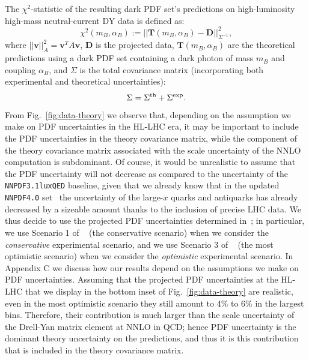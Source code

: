 \documentclass[withindex,glossary]{cam-thesis}
\renewcommand{\vec}[1]{\textbf{#1}} %
\begin{document}
The $\chi^2$-statistic of the resulting dark PDF set's predictions on high-luminosity high-mass neutral-current DY data is defined as: 
\begin{equation}
\label{eq:chi2stat}
\chi^2(m_B, \alpha_B) := ||\vec{T}(m_B, \alpha_B) - \vec{D}||^2_{\Sigma^{-1}},
\end{equation}
where $||\vec{v}||_{A}^2 = \vec{v}^T A \vec{v}$, $\vec{D}$ is the projected data, 
$\vec{T}(m_B,\alpha_B)$ are the theoretical predictions using a dark
PDF set containing a dark photon of mass $m_B$ and coupling
$\alpha_B$, and $\Sigma$ is the total
covariance matrix (incorporating both experimental and theoretical
uncertainties):
\begin{equation}
\Sigma = \Sigma^{\rm th}+\Sigma^{\rm exp}.
\end{equation}
From Fig.~\ref{fig:data-theory} we observe that, depending on the assumption we make on PDF
uncertainties in the HL-LHC era, it may be important to
include the PDF uncertainties in the theory covariance matrix, while
the component of the theory covariance matrix associated with the
scale uncertainty of the NNLO computation is subdominant. 
Of course, it would be unrealistic to assume that the PDF uncertainty will not decrease as compared to the
  uncertainty of the {\tt NNPDF3.1luxQED} baseline, given that we already know
  that in the updated {\tt NNPDF4.0} set~\cite{NNPDF:2021njg} the uncertainty of the large-$x$
  quarks and antiquarks has already decreased by a sizeable amount
  thanks to the inclusion of precise LHC data. We thus decide to use
  the projected PDF uncertainties determined in~\cite{Khalek:2018}; in particular, we use Scenario 1 of ~\cite{Khalek:2018} (the conservative scenario) when we
  consider the {\it conservative} experimental scenario, and we use Scenario 3 of ~\cite{Khalek:2018} (the most optimistic scenario) when we
  consider the {\it optimistic} experimental scenario.  In Appendix C
  we discuss how our results depend on the assumptions we make on PDF
  uncertainties. 
  Assuming that the projected PDF uncertainties at the HL-LHC that we display in the
  bottom inset of Fig.~\ref{fig:data-theory} are realistic, even in
  the most optimistic scenario they still amount to 4\% to 6\% in the
  largest bins. Therefore, their contribution is much larger than the
  scale uncertainty of the Drell-Yan matrix element at NNLO in
  QCD; hence PDF uncertainty is the dominant theory uncertainty on the
   predictions, and thus it is this contribution that is included in the theory covariance matrix. 
\end{document}
